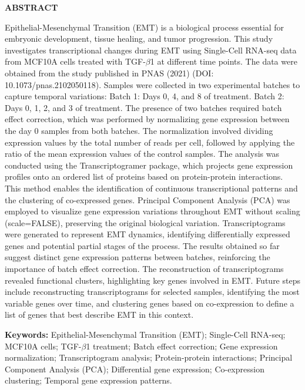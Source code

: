 \documentclass[12pt]{article}
\begin{document}
\newpage

\begin{center}
\textbf{ABSTRACT}
\end{center}

Epithelial-Mesenchymal Transition (EMT) is a biological process essential for embryonic development, tissue healing, and tumor progression. This study investigates transcriptional changes during EMT using Single-Cell RNA-seq data from MCF10A cells treated with TGF-$\beta$1 at different time points. The data were obtained from the study published in PNAS (2021) (DOI: 10.1073/pnas.2102050118). Samples were collected in two experimental batches to capture temporal variations: Batch 1: Days 0, 4, and 8 of treatment. Batch 2: Days 0, 1, 2, and 3 of treatment. The presence of two batches required batch effect correction, which was performed by normalizing gene expression between the day 0 samples from both batches. The normalization involved dividing expression values by the total number of reads per cell, followed by applying the ratio of the mean expression values of the control samples. The analysis was conducted using the Transcriptogramer package, which projects gene expression profiles onto an ordered list of proteins based on protein-protein interactions. This method enables the identification of continuous transcriptional patterns and the clustering of co-expressed genes. Principal Component Analysis (PCA) was employed to visualize gene expression variations throughout EMT without scaling (scale=FALSE), preserving the original biological variation. Transcriptograms were generated to represent EMT dynamics, identifying differentially expressed genes and potential partial stages of the process. The results obtained so far suggest distinct gene expression patterns between batches, reinforcing the importance of batch effect correction. The reconstruction of transcriptograms revealed functional clusters, highlighting key genes involved in EMT. Future steps include reconstructing transcriptograms for selected samples, identifying the most variable genes over time, and clustering genes based on co-expression to define a list of genes that best describe EMT in this context.

\textbf{Keywords:} Epithelial-Mesenchymal Transition (EMT); Single-Cell RNA-seq; MCF10A cells; TGF-$\beta$1 treatment; Batch effect correction; Gene expression normalization; Transcriptogram analysis; Protein-protein interactions; Principal Component Analysis (PCA); Differential gene expression; Co-expression clustering; Temporal gene expression patterns.
\end{document}
